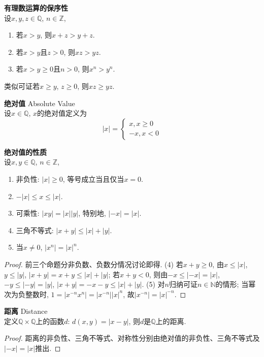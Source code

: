 \begin{pro}\textbf{有理数运算的保序性}\\
设$x,y,z \in \mathbb{Q}$, $n\in \mathbb{Z}$,
\begin{enumerate}
\item 若$x>y$, 则$x+z>y+z$.
\item 若$x>y$且$z>0$, 则$xz>yz$.
\item 若$x>y\ge 0$且$n>0$, 则$x^n>y^n$. 
\end{enumerate}
\end{pro}
类似可证若$x\ge y$, $z\ge 0$, 则$xz\ge yz$. 


\begin{dfn} \textbf{绝对值} Absolute Value\\
设$x\in \mathbb{Q}$, $x$的绝对值定义为
\begin{equation}
|x|=\begin{cases}
x, x\ge 0\\
-x, x<0
\end{cases}
\end{equation}
\end{dfn}

\begin{pro} \textbf{绝对值的性质}\\
设$x,y\in \mathbb{Q}$, $n\in \mathbb{Z}$,
\begin{enumerate}
\item 非负性: $|x|\ge 0$, 等号成立当且仅当$x=0$.
\item $-|x|\le x \le |x|$.
\item 可乘性: $|xy|=|x||y|$, 特别地, $|-x|=|x|$.
\item 三角不等式: $|x+y|\le |x|+|y|$.
\item 当$x\neq 0$, $|x^n|=|x|^n$.
\end{enumerate}
\label{pro:abs_rational}
\end{pro}
\begin{proof}
前三个命题分非负数、负数分情况讨论即得. (4) 若$x+y\ge 0$, 由$x\le |x|$, $y\le |y|$, $|x+y|=x+y\le |x|+|y|$; 若$x+y<0$, 则由$-x\le |-x|=|x|$, $-y\le |-y|=|y|$, $|x+y|=-x-y\le |x|+|y|$. (5) 对$n$归纳可证$n\in \mathbb{N}$的情形; 当幂次为负整数时, $1=|x^{-n}x^n|=|x^{-n}||x|^n$, 故$|x^{-n}|=|x|^{-n}$.
\end{proof}

\begin{col} \textbf{距离} Distance\\
定义$\mathbb{Q}\times\mathbb{Q}$上的函数$d$: $d(x,y)=|x-y|$, 则$d$是$\mathbb{Q}$上的距离. 
\end{col}
\begin{proof}
距离的非负性、三角不等式、对称性分别由绝对值的非负性、三角不等式及$|-x|=|x|$推出.
\end{proof}

